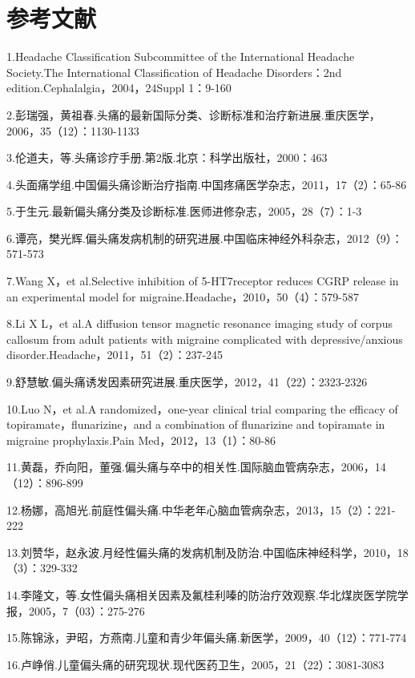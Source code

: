 \protect\hypertarget{text00357.html}{}{}

\section{参考文献}

1.Headache Classification Subcommittee of the International Headache
Society.The International Classification of Headache Disorders：2nd
edition.Cephalalgia，2004，24Suppl 1：9-160

2.彭瑞强，黄祖春.头痛的最新国际分类、诊断标准和治疗新进展.重庆医学，2006，35（12）：1130-1133

3.伦道夫，等.头痛诊疗手册.第2版.北京：科学出版社，2000：463

4.头面痛学组.中国偏头痛诊断治疗指南.中国疼痛医学杂志，2011，17（2）：65-86

5.于生元.最新偏头痛分类及诊断标准.医师进修杂志，2005，28（7）：1-3

6.谭亮，樊光辉.偏头痛发病机制的研究进展.中国临床神经外科杂志，2012（9）：571-573

7.Wang X，et al.Selective inhibition of 5-HT7receptor reduces CGRP
release in an experimental model for
migraine.Headache，2010，50（4）：579-587

8.Li X L，et al.A diffusion tensor magnetic resonance imaging study of
corpus callosum from adult patients with migraine complicated with
depressive/anxious disorder.Headache，2011，51（2）：237-245

9.舒慧敏.偏头痛诱发因素研究进展.重庆医学，2012，41（22）：2323-2326

10.Luo N，et al.A randomized，one-year clinical trial comparing the
efficacy of topiramate，flunarizine，and a combination of flunarizine
and topiramate in migraine prophylaxis.Pain Med，2012，13（1）：80-86

11.黄磊，乔向阳，董强.偏头痛与卒中的相关性.国际脑血管病杂志，2006，14（12）：896-899

12.杨娜，高旭光.前庭性偏头痛.中华老年心脑血管病杂志，2013，15（2）：221-222

13.刘赞华，赵永波.月经性偏头痛的发病机制及防治.中国临床神经科学，2010，18（3）：329-332

14.李隆文，等.女性偏头痛相关因素及氟桂利嗪的防治疗效观察.华北煤炭医学院学报，2005，7（03）：275-276

15.陈锦泳，尹昭，方燕南.儿童和青少年偏头痛.新医学，2009，40（12）：771-774

16.卢峥俏.儿童偏头痛的研究现状.现代医药卫生，2005，21（22）：3081-3083

